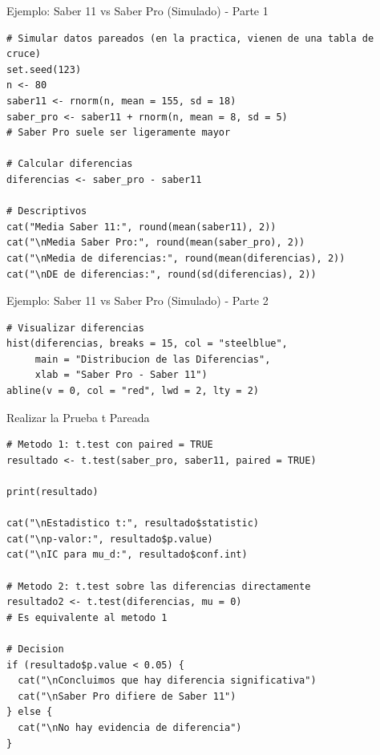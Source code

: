 \documentclass[aspectratio=169, 11pt]{beamer}
\begin{document}
\begin{frame}[fragile]{Ejemplo: Saber 11 vs Saber Pro (Simulado) - Parte 1}
\begin{lstlisting}
# Simular datos pareados (en la practica, vienen de una tabla de cruce)
set.seed(123)
n <- 80
saber11 <- rnorm(n, mean = 155, sd = 18)
saber_pro <- saber11 + rnorm(n, mean = 8, sd = 5)
# Saber Pro suele ser ligeramente mayor

# Calcular diferencias
diferencias <- saber_pro - saber11

# Descriptivos
cat("Media Saber 11:", round(mean(saber11), 2))
cat("\nMedia Saber Pro:", round(mean(saber_pro), 2))
cat("\nMedia de diferencias:", round(mean(diferencias), 2))
cat("\nDE de diferencias:", round(sd(diferencias), 2))
\end{lstlisting}
\end{frame}

\begin{frame}[fragile]{Ejemplo: Saber 11 vs Saber Pro (Simulado) - Parte 2}
\begin{lstlisting}
# Visualizar diferencias
hist(diferencias, breaks = 15, col = "steelblue",
     main = "Distribucion de las Diferencias",
     xlab = "Saber Pro - Saber 11")
abline(v = 0, col = "red", lwd = 2, lty = 2)
\end{lstlisting}
\end{frame}

\begin{frame}[fragile]{Realizar la Prueba t Pareada}
\begin{lstlisting}[basicstyle=\ttfamily\scriptsize]
# Metodo 1: t.test con paired = TRUE
resultado <- t.test(saber_pro, saber11, paired = TRUE)

print(resultado)

cat("\nEstadistico t:", resultado$statistic)
cat("\np-valor:", resultado$p.value)
cat("\nIC para mu_d:", resultado$conf.int)

# Metodo 2: t.test sobre las diferencias directamente
resultado2 <- t.test(diferencias, mu = 0)
# Es equivalente al metodo 1

# Decision
if (resultado$p.value < 0.05) {
  cat("\nConcluimos que hay diferencia significativa")
  cat("\nSaber Pro difiere de Saber 11")
} else {
  cat("\nNo hay evidencia de diferencia")
}
\end{lstlisting}
\end{frame}
\end{document}
